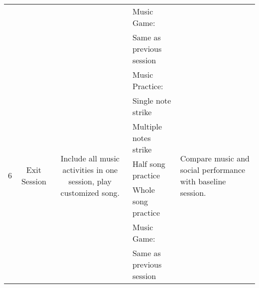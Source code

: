 \begin{table}[htbp]
\begin{tabular}{|c|c|c|p{16.07em}|l|}
          &       &       & Music Game: &  \\
          &       &       & Same as previous session &  \\
    \midrule
    \multirow{7}[2]{*}{6} & \multicolumn{1}{c|}{\multirow{7}[2]{*}{Exit Session}} & \multicolumn{1}{c|}{\multirow{7}[2]{*}{Include all music activities in one session, play customized song.}} & Music Practice: & \multicolumn{1}{l|}{\multirow{7}[2]{*}{Compare music and social performance with baseline session.}} \\
          &       &       & Single note strike &  \\
          &       &       & Multiple notes strike &  \\
          &       &       & Half song practice &  \\
          &       &       & Whole song practice &  \\
          &       &       & Music Game: &  \\
          &       &       & Same as previous session &  \\
    \bottomrule
    \end{tabular}%
  \label{tab:addlabel}%
\end{table}%
